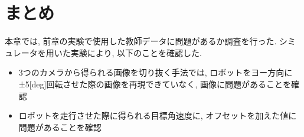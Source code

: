 \clearpage
\section{まとめ}
本章では, 前章の実験で使用した教師データに問題があるか調査を行った. シミュレータを用いた実験により, 以下のことを確認した.

\begin{itemize}
  \item 3つのカメラから得られる画像を切り抜く手法では, ロボットをヨー方向に±5[deg]回転させた際の画像を再現できていなく, 画像に問題があることを確認
  \item ロボットを走行させた際に得られる目標角速度に, オフセットを加えた値に問題があることを確認
\end{itemize}



